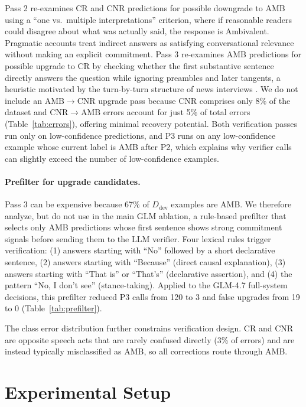 \documentclass[11pt]{article}
\newcommand{\rev}[1]{#1}
\begin{document}
Pass 2 re-examines CR and CNR predictions for possible downgrade to AMB using a ``one vs.\ multiple interpretations'' criterion, where if reasonable readers could disagree about what was actually said, the response is Ambivalent. Pragmatic accounts \citep{grice1975logic,bavelas1990equivocal,clayman2001answers} treat indirect answers as satisfying conversational relevance without making an explicit commitment. Pass 3 re-examines AMB predictions for possible upgrade to CR by checking whether the first substantive sentence directly answers the question while ignoring preambles and later tangents, a heuristic motivated by the turn-by-turn structure of news interviews \citep{clayman2002news,bull1993how}. We do not include an AMB$\rightarrow$CNR upgrade pass because CNR comprises only 8\% of the dataset and CNR$\rightarrow$AMB errors account for just \rev{5\%} of total errors (Table~\ref{tab:errors}), offering minimal recovery potential. Both verification passes run only on low-confidence predictions, and \rev{P3 runs on any low-confidence example whose current label is AMB after P2, which explains why verifier calls can slightly exceed the number of low-confidence examples.}

\paragraph{Prefilter for upgrade candidates.} Pass 3 can be expensive because 67\% of $D_{\text{dev}}$ examples are AMB. We therefore analyze, but do not use in the main GLM ablation, a rule-based prefilter that selects only AMB predictions whose first sentence shows strong commitment signals before sending them to the LLM verifier. Four lexical rules trigger verification: (1) answers starting with ``No'' followed by a short declarative sentence, (2) answers starting with ``Because'' (direct causal explanation), (3) answers starting with ``That is'' or ``That's'' (declarative assertion), and (4) the pattern ``No, I don't see'' (stance-taking). Applied to the GLM-4.7 full-system decisions, this prefilter reduced P3 calls from 120 to 3 and false upgrades from 19 to 0 (Table~\ref{tab:prefilter}).

The class error distribution further constrains verification design. CR and CNR are opposite speech acts that are rarely confused directly (3\% of errors) and are instead typically misclassified as AMB, so all corrections route through AMB.


\section{Experimental Setup}
\end{document}
